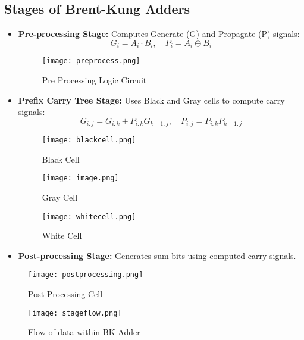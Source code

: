 \documentclass{IEEEtran}
\begin{document}
\subsection{Stages of Brent-Kung Adders}
\begin{itemize}
    \item \textbf{Pre-processing Stage:} Computes Generate (G) and Propagate (P) signals:\begin{equation}
        G_i = A_i \cdot B_i, \quad P_i = A_i \oplus B_i
    \end{equation}
\begin{figure}[H]
    \centering
    \texttt{[image: preprocess.png]}
    \caption{Pre Processing Logic Circuit}
    \label{fig:}
\end{figure}
    
    \item \textbf{Prefix Carry Tree Stage:} Uses Black and Gray cells to compute carry signals:\begin{equation}
        G_{i:j} = G_{i:k} + P_{i:k} G_{k-1:j}, \quad P_{i:j} = P_{i:k} P_{k-1:j}
    \end{equation}
    \begin{figure}[H]
            \centering
            \texttt{[image: blackcell.png]}
            \caption{Black Cell}
            \label{fig:enter-label}
        \end{figure}

\begin{figure}[H]
    \centering
    \texttt{[image: image.png]}
    \caption{Gray Cell}
    \label{fig:enter-label}
\end{figure}
\begin{figure}[H]
    \centering
    \texttt{[image: whitecell.png]}
    \caption{White Cell}
    \label{fig:enter-label}
\end{figure}
    \item \textbf{Post-processing Stage:} Generates sum bits using computed carry signals.
\end{itemize}
\begin{figure}[H]
    \centering
    \texttt{[image: postprocessing.png]}
    \caption{Post Processing Cell}
    \label{fig:enter-label}
\end{figure}

\begin{figure}[H]
    \centering
    \texttt{[image: stageflow.png]}
    \caption{Flow of data within BK Adder}
    \label{fig:enter-label}
\end{figure}
\end{document}
